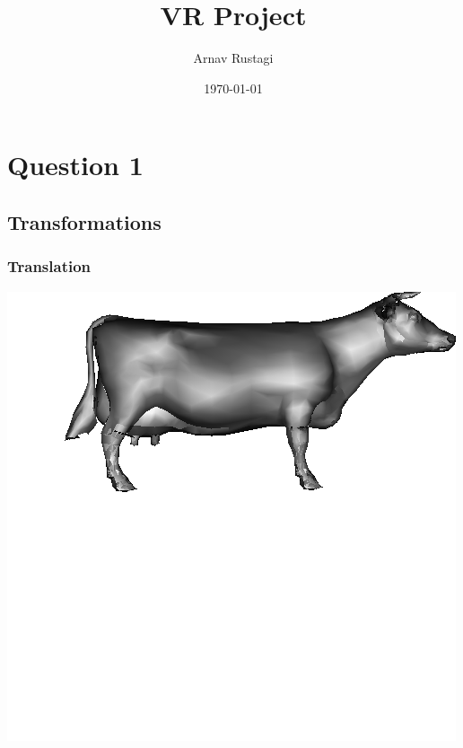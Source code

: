 \documentclass[11pt]{article}
\title{ VR Project}
\author{ Arnav Rustagi}
\date{\today}
\begin{document}
\maketitle	
\pagebreak

\tableofcontents


\section{Question 1}

\subsection{Transformations}
\subsubsection{Translation}
\begin{center}\includegraphics{translation}\end{center}
\end{document}
